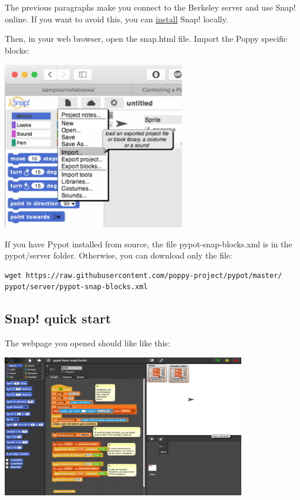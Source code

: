 \documentclass{article}
\begin{document}
The previous paragraphs make you connect to the Berkeley server and use Snap! online. If you want to avoid this, you can \href{https://github.com/jmoenig/Snap--Build-Your-Own-Blocks}{install} Snap! locally.

Then, in your web browser, open the snap.html file. Import the Poppy specific blocks:

 \begin{center}
  \includegraphics[width=0.6\textwidth]{img/snap-import}
 \end{center}

If you have Pypot installed from source, the file pypot-snap-blocks.xml is in the pypot/server folder. Otherwise, you can download only the file:
\begin{verbatim}
wget https://raw.githubusercontent.com/poppy-project/pypot/master/
pypot/server/pypot-snap-blocks.xml
\end{verbatim}

\subsection{Snap! quick start}

The webpage you opened should like like this:

 \begin{center}
  \includegraphics[width=0.8\textwidth]{img/snap_full}
 \end{center}
\end{document}
